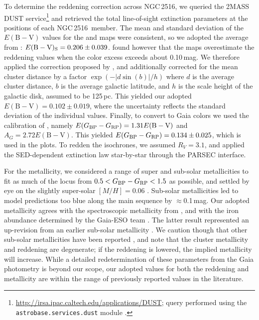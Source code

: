 \documentclass[12pt,twocolumn,tighten]{aastex63}
\newcommand{\cn}{NGC\,2516} %
\newcommand{\bpmrp}{G_{\rm BP}-G_{\rm RP}}
\begin{document}
To determine the reddening correction across \cn, we queried the 2MASS
DUST service\footnote{
  \url{http://irsa.ipac.caltech.edu/applications/DUST}; query
  performed using the \texttt{astrobase.services.dust} module
  \citep{bhatti_astrobase_2018}.  } and retrieved the total
line-of-sight extinction parameters at the positions of each \cn\ 
member.  The mean and standard deviation of the
$E(\mathrm{B}-\mathrm{V})$ values for the \citet{schlegel_maps_1998}
and \citet{schlafly_measuring_2011} maps were consistent, so we
adopted the average from \citet{schlegel_maps_1998}:
$E(\mathrm{B}-\mathrm{V})_{\rm S}=0.206\pm0.039$.
\citet{bonifacio_search_2000} found however that the
\citet{schlegel_maps_1998} maps overestimate the reddening values when
the color excess exceeds about 0.10\,mag. We therefore applied the
correction proposed by \citet{bonifacio_search_2000}, and additionally
corrected for the mean cluster distance by a factor
$\exp(-|d\sin(b)|/h)$ where $d$ is the average cluster distance,
$b$ is the average galactic latitude, and $h$ is the scale height of
the galactic disk, assumed to be 125\,pc.  This yielded our adopted
$E(\mathrm{B}-\mathrm{V})=0.102\pm0.019$, where the uncertainty
reflects the standard deviation of the individual
\citet{schlegel_maps_1998} values.  Finally, to convert to Gaia
colors we used the calibration of \citet{stassun_TIC8_2019}, namely
$E(\bpmrp)=1.31 E(\mathrm{B}-\mathrm{V})$ and
$A_G=2.72 E(\mathrm{B}-\mathrm{V})$.  This yielded
$E(\bpmrp)=0.134\pm0.025$, which is used in the
plots.  To redden the isochrones, we assumed $R_V=3.1$, and applied
the \citet{odonnell_1994} SED-dependent extinction law star-by-star
through the PARSEC interface. 

For the metallicity, we considered a range of super and sub-solar metallicities
to fit as much of the locus from $0.5<\bpmrp<1.5$ as possible, and settled by
eye on the slightly super-solar $[M/H]=0.06$ \citep{cummings_2011_li_iron}.
Sub-solar metallicities led to model predictions too blue along the main
sequence by $\approx$0.1\,mag.  Our adopted metallicity agrees with the
spectroscopic metallicity from \citet[][Sec~4.4.4]{cummings_2011_li_iron}, and
with the iron abundance determined by the Gaia-ESO team
\citep{baratella_gaiaeso_2020}. The latter result represented an up-revision
from an earlier sub-solar metallicity \citep{randich_gaiaeso_2018}.  We caution
though that other sub-solar metallicities have been reported
\citep{bailey_rv_2018}, and note that the cluster metallicity and reddening are
degenerate; if the reddening is lowered, the implied metallicity will increase.
While a detailed redetermination of these parameters from the Gaia photometry
is beyond our scope, our adopted values for both the reddening and metallicity
are within the range of previously reported values in the literature.
\end{document}
